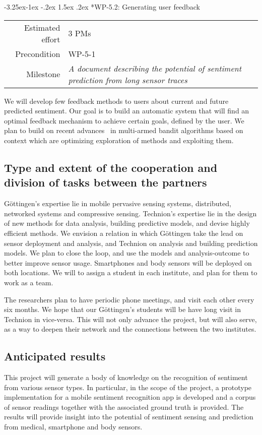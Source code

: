 \documentclass[12pt]{article}
\makeatletter
\renewcommand\paragraph{\@startsection{paragraph}{4}{\z@}%
  {-3.25ex\@plus -1ex \@minus -.2ex}%
  {1.5ex \@plus .2ex}%
  {\normalfont\normalsize\bfseries}}
\makeatother
\begin{document}
\paragraph*{WP-5.2: Generating user feedback}
\begin{tabular}{rl}
	Estimated effort& 3 PMs\\
	Precondition & WP-5-1\\
	Milestone & \begin{minipage}[t]{12.2cm}
		\textit{A document describing the potential of sentiment prediction from long sensor traces}\vspace{.2cm}
	\end{minipage}
\end{tabular}

\noindent
We will develop few feedback methods to users about current and future predicted sentiment. Our goal is to build an automatic system that will find an optimal feedback mechanism to achieve certain goals, defined by the user. We plan to build on recent advances~\cite{DBLP:journals/ml/CrammerG13} in multi-armed bandit algorithms based on context which are optimizing exploration of methods and exploiting them.


\subsection*{Type and extent of the cooperation and division of tasks between the partners}
Göttingen's expertise lie in mobile pervasive sensing systems, distributed, networked systems and compressive sensing.  
Technion's expertise lie in the design of new methods for data analysis, building predictive models, and devise highly efficient methods. We envision a relation in which Göttingen take the lead on sensor deployment and analysis, and Technion on analysis and building prediction models. We plan to close the loop, and use the models and analysis-outcome to better improve sensor usage. Smartphones and body sensors will be deployed on both locations. We will to assign a student in each institute, and plan for them to work as a team.

The researchers plan to have periodic phone meetings, and visit each other every six months. We hope that our Göttingen's students will be have long visit in Technion in vice-versa. This will not only advance the project, but will also serve, as a way to deepen their network and the connections between the two institutes. 


\subsection*{Anticipated results}
This project will generate a body of knowledge on the recognition of sentiment from various sensor types.
In particular, in the scope of the project, a prototype implementation for a mobile sentiment recognition app is developed and a corpus of sensor readings together with the associated ground truth is provided. 
The results will provide insight into the potential of sentiment sensing and prediction from medical, smartphone and body sensors.
\end{document}
